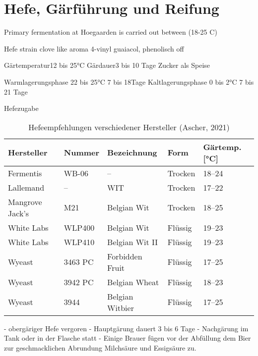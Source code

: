 \documentclass[a4paper,parskip=half]{scrartcl}
\begin{document}
\section{Hefe, Gärführung und Reifung}

\parencite[31]{Sparrow2002}
Primary fermentation at Hoegaarden is carried out between (18-25 C)

\parencite[46]{Roncoroni2018}
Hefe strain clove like aroma 4-vinyl guaiacol, phenolisch off

\parencite[13]{Strottner1999}
Gärtemperatur12 bis 25°C
Gärdauer3 bis 10 Tage
Zucker als Speise

\parencite[14]{Strottner1999}
Warmlagerungsphase
22 bis 25°C
7 bis 18Tage
Kaltlagerungsphase
0 bis 2°C
7 bis 21 Tage

Hefezugabe

\begin{table}[]
\centering
\begin{tabular}{lllll}
\toprule
Hersteller      & Nummer  & Bezeichnung          & Form    & Gärtemp. [°C] \\
\midrule
Fermentis       & WB-06   & --                   & Trocken & 18--24        \\
Lallemand       & --      & WIT                  & Trocken & 17--22        \\
Mangrove Jack's & M21     & Belgian Wit          & Trocken & 18--25        \\
White Labs      & WLP400  & Belgian Wit          & Flüssig & 19--23        \\
White Labs      & WLP410  & Belgian Wit II       & Flüssig & 19--23        \\
Wyeast          & 3463 PC & Forbidden Fruit      & Flüssig & 17--25        \\
Wyeast          & 3942 PC & Belgian Wheat        & Flüssig & 18--23        \\
Wyeast          & 3944    & Belgian Witbier      & Flüssig & 17--25        \\
\bottomrule
\end{tabular}
\caption{Hefeempfehlungen verschiedener Hersteller (Ascher, 2021)}
\label{table:yeasts}
\end{table}

\parencite[2]{Strottner1999}
- obergäriger Hefe vergoren
- Hauptgärung dauert 3 bis 6 Tage
- Nachgärung im Tank oder in der Flasche statt
- Einige Brauer fügen vor der Abfüllung dem Bier zur geschmacklichen Abrundung Milchsäure und Essigsäure zu.
\end{document}
